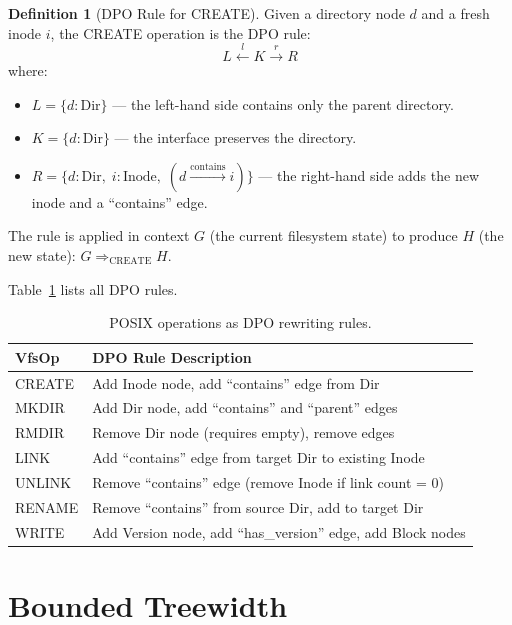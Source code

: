 \documentclass[11pt,a4paper,twoside]{report}
\theoremstyle{definition}
\newtheorem{definition}{Definition}[chapter]
\begin{document}
\begin{definition}[DPO Rule for CREATE]
\label{def:dpo-create}
Given a directory node $d$ and a fresh inode $i$, the CREATE operation is
the DPO rule:
\[
  L \xleftarrow{l} K \xrightarrow{r} R
\]
where:
\begin{itemize}[leftmargin=1.4em]
  \item $L = \{d : \text{Dir}\}$ --- the left-hand side contains only the
    parent directory.
  \item $K = \{d : \text{Dir}\}$ --- the interface preserves the directory.
  \item $R = \{d : \text{Dir},\; i : \text{Inode},\;
    (d \xrightarrow{\text{contains}} i)\}$ --- the right-hand side adds
    the new inode and a ``contains'' edge.
\end{itemize}
The rule is applied in context $G$ (the current filesystem state) to produce
$H$ (the new state): $G \Rightarrow_{\text{CREATE}} H$.
\end{definition}

Table~\ref{tab:dpo-rules} lists all DPO rules.

\begin{table}[H]
\centering
\caption{POSIX operations as DPO rewriting rules.}
\label{tab:dpo-rules}
\begin{tabularx}{\textwidth}{l X}
\toprule
\textbf{VfsOp} & \textbf{DPO Rule Description} \\
\midrule
CREATE  & Add Inode node, add ``contains'' edge from Dir \\
MKDIR   & Add Dir node, add ``contains'' and ``parent'' edges \\
RMDIR   & Remove Dir node (requires empty), remove edges \\
LINK    & Add ``contains'' edge from target Dir to existing Inode \\
UNLINK  & Remove ``contains'' edge (remove Inode if link count = 0) \\
RENAME  & Remove ``contains'' from source Dir, add to target Dir \\
WRITE   & Add Version node, add ``has\_version'' edge, add Block nodes \\
\bottomrule
\end{tabularx}
\end{table}

\section{Bounded Treewidth}
\end{document}
